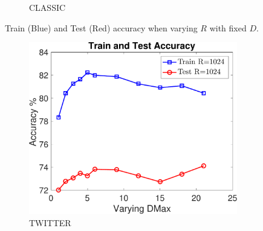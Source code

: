 \documentclass[11pt,a4paper]{article}
\newcommand{\1}{\boldsymbol{1}}
\begin{document}
\begin{figure}[ht]
\begin{subfigure}[b]{0.23\textwidth}
      \caption{CLASSIC}
      \label{fig:exptsA_varyingR_classic}
     	\end{subfigure}
\vspace{0mm}
\caption{Train (Blue) and Test (Red) accuracy when varying $R$ with fixed $D$.}
\label{fig:exptsA_varyingR}
\vspace{0mm}
\end{figure}

\begin{figure}[ht]
\centering
		\begin{subfigure}[b]{0.23\textwidth}
      \includegraphics[width=\textwidth]{Graphs/wmdk_varyingD/twitter_Accu_VaryingD_CV_R1024_dataSplit1-eps-converted-to.pdf}
      \caption{TWITTER}
      \label{fig:exptsA_varyingD_twitter}
      \end{subfigure}
      \begin{subfigure}[b]{0.23\textwidth}

\end{subfigure}
\end{figure}
\end{document}
